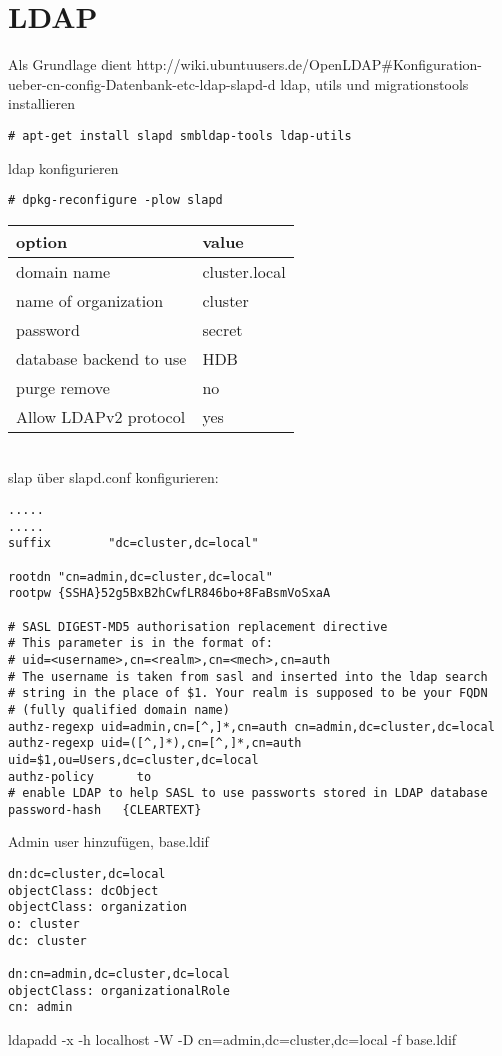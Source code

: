 \chapter{LDAP}
Als Grundlage dient http://wiki.ubuntuusers.de/OpenLDAP#Konfiguration-ueber-cn-config-Datenbank-etc-ldap-slapd-d
ldap, utils und migrationstools installieren
\begin{lstlisting}[style=Bash]
# apt-get install slapd smbldap-tools ldap-utils
\end{lstlisting}
ldap konfigurieren
\begin{lstlisting}[style=Bash]
# dpkg-reconfigure -plow slapd
\end{lstlisting}
\begin{tabular}{ l | l }
 option & value\\
 \hline
 domain name & cluster.local\\
 name of organization & cluster\\
 password & secret\\
 database backend to use & HDB\\
 purge remove & no\\
 Allow LDAPv2 protocol & yes\\
\end{tabular}
\\
slap über slapd.conf konfigurieren:
\begin{lstlisting}[style=Bash]
.....
.....
suffix        "dc=cluster,dc=local"

rootdn "cn=admin,dc=cluster,dc=local"
rootpw {SSHA}52g5BxB2hCwfLR846bo+8FaBsmVoSxaA

# SASL DIGEST-MD5 authorisation replacement directive
# This parameter is in the format of:
# uid=<username>,cn=<realm>,cn=<mech>,cn=auth
# The username is taken from sasl and inserted into the ldap search 
# string in the place of $1. Your realm is supposed to be your FQDN 
# (fully qualified domain name)
authz-regexp uid=admin,cn=[^,]*,cn=auth cn=admin,dc=cluster,dc=local
authz-regexp uid=([^,]*),cn=[^,]*,cn=auth uid=$1,ou=Users,dc=cluster,dc=local
authz-policy      to
# enable LDAP to help SASL to use passworts stored in LDAP database
password-hash   {CLEARTEXT}
\end{lstlisting}

Admin user hinzufügen, base.ldif
\begin{lstlisting}[style=Bash]
dn:dc=cluster,dc=local
objectClass: dcObject
objectClass: organization
o: cluster
dc: cluster

dn:cn=admin,dc=cluster,dc=local
objectClass: organizationalRole
cn: admin
\end{lstlisting}
ldapadd -x -h localhost -W -D cn=admin,dc=cluster,dc=local -f base.ldif 

